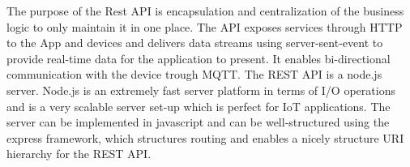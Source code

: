 The purpose of the Rest API is encapsulation and centralization of the business logic to only maintain it in one place. The API exposes services through HTTP to the App and devices and delivers data streams using server-sent-event to provide real-time data for the application to present. It enables bi-directional communication with the device trough MQTT. The REST API is a node.js server. Node.js is an extremely fast server platform in terms of I/O operations and is a very scalable server set-up which is perfect for IoT applications. The server can be implemented in javascript and can be well-structured using the express framework, which structures routing and enables a nicely structure URI hierarchy for the REST API.  